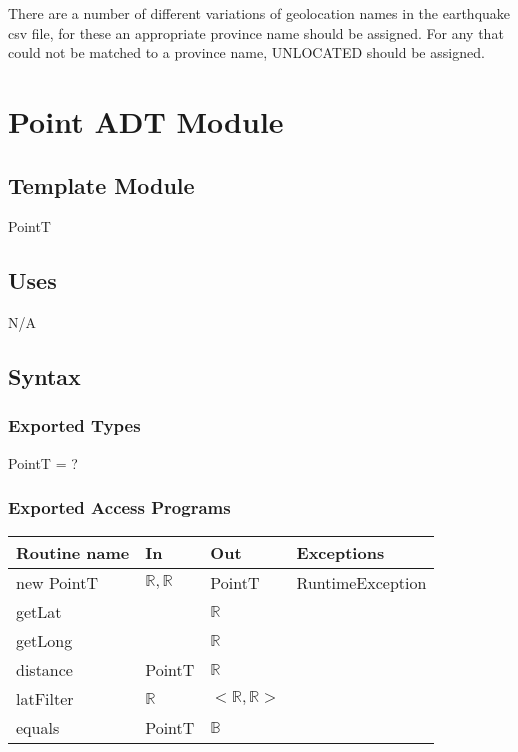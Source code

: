 \documentclass[12pt]{article}
\begin{document}
There are a number of different variations of geolocation names in the earthquake csv file, for these an appropriate province name
should be assigned. For any that could not be matched to a province name, UNLOCATED should be assigned.\\



\newpage

\section* {Point ADT Module}

\subsection* {Template Module}

PointT

\subsection* {Uses}

N/A

\subsection* {Syntax}

\subsubsection* {Exported Types}

PointT = ?


\subsubsection* {Exported Access Programs}

\begin{tabular}{| l | l | l | l |}
\hline
\textbf{Routine name} & \textbf{In} & \textbf{Out} & \textbf{Exceptions}\\
\hline
new PointT & $\mathbb{R}, \mathbb{R}$ & PointT & RuntimeException\\
\hline
getLat & ~ & $\mathbb{R}$ & \\
\hline
getLong &~ & $\mathbb{R}$ & \\
\hline
distance & PointT & $\mathbb{R}$ & \\
\hline
latFilter & $\mathbb{R}$ & $<\mathbb{R}, \mathbb{R}>$ & \\
\hline
equals & PointT & $\mathbb{B}$ & \\
\hline

\end{tabular}
\end{document}
